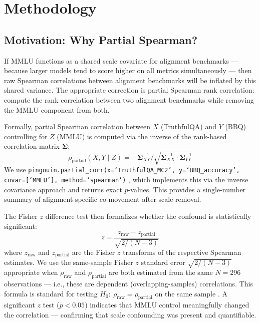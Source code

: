 \section{Methodology}
\label{sec:method}

\subsection{Motivation: Why Partial Spearman?}

If MMLU functions as a shared scale covariate for alignment benchmarks --- because larger models tend to score higher on all metrics simultaneously --- then raw Spearman correlations between alignment benchmarks will be inflated by this shared variance. The appropriate correction is partial Spearman rank correlation: compute the rank correlation between two alignment benchmarks while removing the MMLU component from both.

Formally, partial Spearman correlation between $X$ (TruthfulQA) and $Y$ (BBQ) controlling for $Z$ (MMLU) is computed via the inverse of the rank-based correlation matrix $\boldsymbol{\Sigma}$:
\begin{equation}
  \rho_{\text{partial}}(X,Y \mid Z) = -\boldsymbol{\Sigma}^{-1}_{XY} \big/ \sqrt{\boldsymbol{\Sigma}^{-1}_{XX} \cdot \boldsymbol{\Sigma}^{-1}_{YY}}
\end{equation}
We use \texttt{pingouin.partial\_corr(x=`TruthfulQA\_MC2', y=`BBQ\_accuracy', covar=[`MMLU'], method=`spearman')} \citep{vallat2018pingouin}, which implements this via the inverse covariance approach and returns exact $p$-values. This provides a single-number summary of alignment-specific co-movement after scale removal.

The Fisher $z$ difference test then formalizes whether the confound is statistically significant:
\begin{equation}
  z = \frac{z_{\text{raw}} - z_{\text{partial}}}{\sqrt{2/(N-3)}}
\end{equation}
where $z_{\text{raw}}$ and $z_{\text{partial}}$ are the Fisher $z$ transforms of the respective Spearman estimates. We use the same-sample Fisher $z$ standard error $\sqrt{2/(N-3)}$ appropriate when $\rho_{\text{raw}}$ and $\rho_{\text{partial}}$ are both estimated from the same $N{=}296$ observations --- i.e., these are dependent (overlapping-samples) correlations. This formula is standard for testing $H_0{:}\ \rho_{\text{raw}} = \rho_{\text{partial}}$ on the same sample \citep{steiger1980}. A significant $z$ test ($p < 0.05$) indicates that MMLU control meaningfully changed the correlation --- confirming that scale confounding was present and quantifiable.


